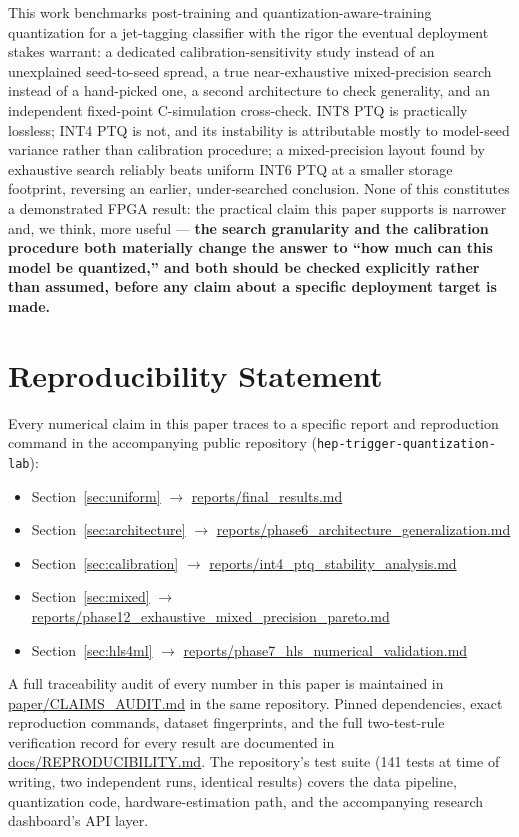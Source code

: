 \documentclass[11pt]{article}
\begin{document}
This work benchmarks post-training and quantization-aware-training quantization for a jet-tagging
classifier with the rigor the eventual deployment stakes warrant: a dedicated calibration-sensitivity
study instead of an unexplained seed-to-seed spread, a true near-exhaustive mixed-precision search
instead of a hand-picked one, a second architecture to check generality, and an independent fixed-point
C-simulation cross-check. INT8 PTQ is practically lossless; INT4 PTQ is not, and its instability is
attributable mostly to model-seed variance rather than calibration procedure; a mixed-precision layout
found by exhaustive search reliably beats uniform INT6 PTQ at a smaller storage footprint, reversing an
earlier, under-searched conclusion. None of this constitutes a demonstrated FPGA result: the practical
claim this paper supports is narrower and, we think, more useful --- \textbf{the search granularity and
the calibration procedure both materially change the answer to ``how much can this model be
quantized,'' and both should be checked explicitly rather than assumed, before any claim about a
specific deployment target is made.}

\section*{Reproducibility Statement}

Every numerical claim in this paper traces to a specific report and reproduction command in the
accompanying public repository (\texttt{hep-trigger-quantization-lab}):
\begin{itemize}
  \item Section~\ref{sec:uniform} $\to$ \url{reports/final_results.md}
  \item Section~\ref{sec:architecture} $\to$ \url{reports/phase6_architecture_generalization.md}
  \item Section~\ref{sec:calibration} $\to$ \url{reports/int4_ptq_stability_analysis.md}
  \item Section~\ref{sec:mixed} $\to$ \url{reports/phase12_exhaustive_mixed_precision_pareto.md}
  \item Section~\ref{sec:hls4ml} $\to$ \url{reports/phase7_hls_numerical_validation.md}
\end{itemize}
A full traceability audit of every number in this paper is maintained in
\url{paper/CLAIMS_AUDIT.md} in the same repository. Pinned dependencies, exact reproduction
commands, dataset fingerprints, and the full two-test-rule verification record for every result are
documented in \url{docs/REPRODUCIBILITY.md}. The repository's test suite (141 tests at time of
writing, two independent runs, identical results) covers the data pipeline, quantization code,
hardware-estimation path, and the accompanying research dashboard's API layer.



\end{document}
